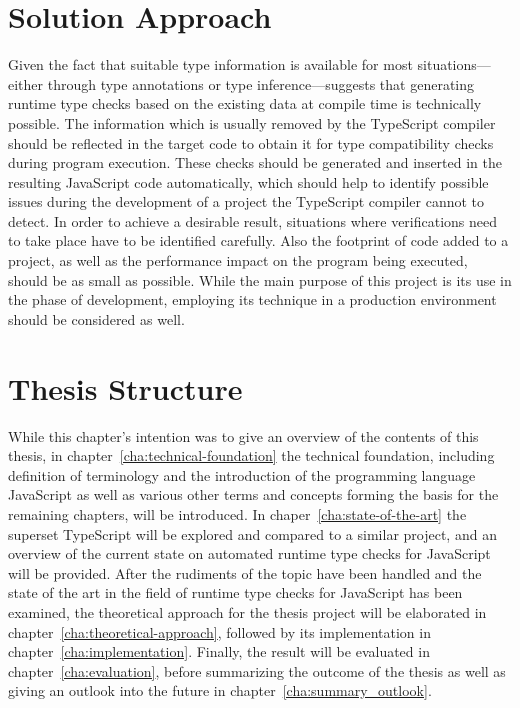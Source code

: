 \section{Solution Approach}
\label{sec:solution-approach}

Given the fact that suitable type information is available for most situations---either through type annotations or type inference---suggests that generating runtime type checks based on the existing data at compile time is technically possible. The information which is usually removed by the TypeScript compiler should be reflected in the target code to obtain it for type compatibility checks during program execution. These checks should be generated and inserted in the resulting JavaScript code automatically, which should help to identify possible issues during the development of a project the TypeScript compiler cannot to detect. In order to achieve a desirable result, situations where verifications need to take place have to be identified carefully. Also the footprint of code added to a project, as well as the performance impact on the program being executed, should be as small as possible. While the main purpose of this project is its use in the phase of development, employing its technique in a production environment should be considered as well.

\section{Thesis Structure}
\label{sec:thesis-structure}

While this chapter's intention was to give an overview of the contents of this thesis, in chapter~\ref{cha:technical-foundation} the technical foundation, including definition of terminology and the introduction of the programming language JavaScript as well as various other terms and concepts forming the basis for the remaining chapters, will be introduced. In chaper~\ref{cha:state-of-the-art} the superset TypeScript will be explored and compared to a similar project, and an overview of the current state on automated runtime type checks for JavaScript will be provided. After the rudiments of the topic have been handled and the state of the art in the field of runtime type checks for JavaScript has been examined, the theoretical approach for the thesis project will be elaborated in chapter~\ref{cha:theoretical-approach}, followed by its implementation in chapter~\ref{cha:implementation}. Finally, the result will be evaluated in chapter~\ref{cha:evaluation}, before summarizing the outcome of the thesis as well as giving an outlook into the future in chapter~\ref{cha:summary_outlook}.
